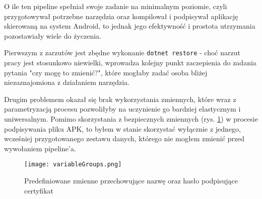 \newpage

O ile ten pipeline spełniał swoje zadanie na minimalnym poziomie, czyli przygotowywał potrzebne narzędzia 
oraz kompilował i podpisywał aplikację skierowaną na system Android, to jednak jego efektywność i prostota 
utrzymania pozostawiały wiele do życzenia.

Pierwszym z zarzutów jest zbędne wykonanie \verb|dotnet restore| - choć narzut pracy 
jest stosunkowo niewielki, wprowadza kolejny punkt zaczepienia do zadania pytania "czy mogę to zmienić?", 
które mogłaby zadać osoba bliżej niezaznajomiona z działaniem narzędzia.

Drugim problemem okazał się brak wykorzystania zmiennych, które wraz z parametryzacją procesu 
pozwoliłyby na uczynienie go bardziej elastycznym i uniwersalnym. Pomimo skorzystania z bezpiecznych 
zmiennych (rys. \ref{img:variableGroups}) w procesie podpisywania pliku APK, 
to byłem w stanie skorzystać wyłącznie z jednego, wcześniej przygotowanego zestawu danych, 
którego nie mogłem zmienić przed wywołaniem pipeline'a.

\begin{figure}[hb]
    \centering
    \texttt{[image: variableGroups.png]}
    \caption{Predefiniowane zmienne przechowujące nazwę oraz hasło podpisujące certyfikat}
    \label{img:variableGroups}
\end{figure}

\newpage